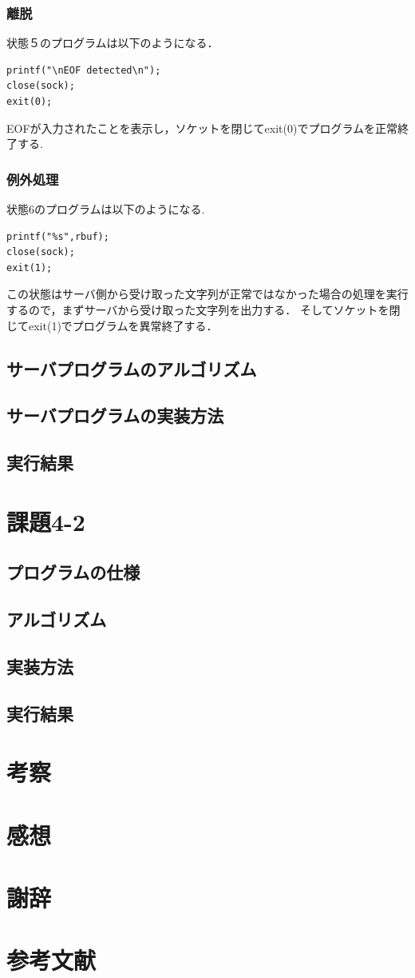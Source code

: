 \documentclass[dvipdfmx]{jarticle}
\begin{document}
\subsubsection{離脱}
状態５のプログラムは以下のようになる．
\begin{lstlisting}
printf("\nEOF detected\n");
close(sock);
exit(0);
\end{lstlisting}
EOFが入力されたことを表示し，ソケットを閉じてexit(0)でプログラムを正常終了する.
\subsubsection{例外処理}
状態6のプログラムは以下のようになる.
\begin{lstlisting}
printf("%s",rbuf);
close(sock);
exit(1);
\end{lstlisting}
この状態はサーバ側から受け取った文字列が正常ではなかった場合の処理を実行するので，まずサーバから受け取った文字列を出力する．
そしてソケットを閉じてexit(1)でプログラムを異常終了する．
\subsection{サーバプログラムのアルゴリズム}
\subsection{サーバプログラムの実装方法}
\subsection{実行結果}
\section{課題4-2}
\subsection{プログラムの仕様}
\subsection{アルゴリズム}
\subsection{実装方法}
\subsection{実行結果}
\section{考察}
\section{感想}
\section{謝辞}
\section{参考文献}
\end{document}
